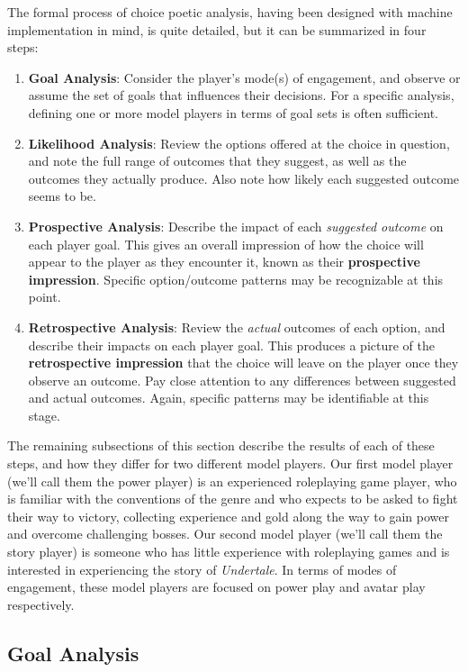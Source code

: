 \documentclass[arts,article,submit,moreauthors,pdftex,10pt,a4paper]{Definitions/mdpi}
\begin{document}
\label{sec:analysis_steps}
The formal process of choice poetic analysis, having been designed with machine implementation in mind, is quite detailed, but it can be summarized in four steps:
\begin{enumerate}
  \item \textbf{Goal Analysis}: Consider the player's mode(s) of engagement, and observe or assume the set of goals that influences their decisions. For a specific analysis, defining one or more model players in terms of goal sets is often sufficient.
  \item \textbf{Likelihood Analysis}: Review the options offered at the choice in question, and note the full range of outcomes that they suggest, as well as the outcomes they actually produce. Also note how likely each suggested outcome seems to be.
  \item \textbf{Prospective Analysis}: Describe the impact of each \emph{suggested outcome} on each player goal. This gives an overall impression of how the choice will appear to the player as they encounter it, known as their \textbf{prospective impression}. Specific option/outcome patterns may be recognizable at this point.
  \item \textbf{Retrospective Analysis}: Review the \emph{actual} outcomes of each option, and describe their impacts on each player goal. This produces a picture of the \textbf{retrospective impression} that the choice will leave on the player once they observe an outcome. Pay close attention to any differences between suggested and actual outcomes. Again, specific patterns may be identifiable at this stage.
\end{enumerate}
The remaining subsections of this section describe the results of each of these steps, and how they differ for two different model players.
%
Our first model player (we'll call them the power player) is an experienced roleplaying game player, who is familiar with the conventions of the genre and who expects to be asked to fight their way to victory, collecting experience and gold along the way to gain power and overcome challenging bosses.
%
Our second model player (we'll call them the story player) is someone who has little experience with roleplaying games and is interested in experiencing the story of \emph{Undertale}.
%
In terms of modes of engagement, these model players are focused on power play and avatar play respectively.

\subsection{Goal Analysis}
\end{document}
